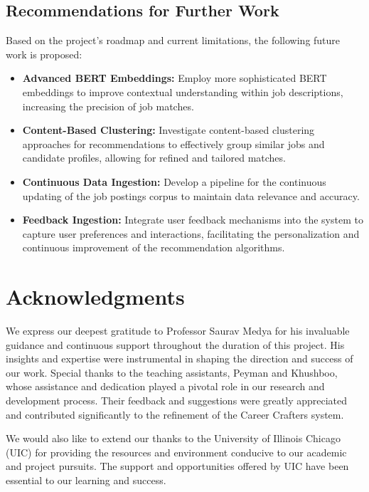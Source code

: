 \documentclass[a4paper,10pt]{article}
\begin{document}
\subsection{Recommendations for Further Work}
Based on the project's roadmap and current limitations, the following future work is proposed:
\begin{itemize}
  \item \textbf{Advanced BERT Embeddings:} Employ more sophisticated BERT embeddings to improve contextual understanding within job descriptions, increasing the precision of job matches.
  \item \textbf{Content-Based Clustering:} Investigate content-based clustering approaches for recommendations to effectively group similar jobs and candidate profiles, allowing for refined and tailored matches.
  \item \textbf{Continuous Data Ingestion:} Develop a pipeline for the continuous updating of the job postings corpus to maintain data relevance and accuracy.
  \item \textbf{Feedback Ingestion:} Integrate user feedback mechanisms into the system to capture user preferences and interactions, facilitating the personalization and continuous improvement of the recommendation algorithms.
\end{itemize}

\section*{Acknowledgments}

We express our deepest gratitude to Professor Saurav Medya for his invaluable guidance and continuous support throughout the duration of this project. His insights and expertise were instrumental in shaping the direction and success of our work. Special thanks to the teaching assistants, Peyman and Khushboo, whose assistance and dedication played a pivotal role in our research and development process. Their feedback and suggestions were greatly appreciated and contributed significantly to the refinement of the Career Crafters system.

We would also like to extend our thanks to the University of Illinois Chicago (UIC) for providing the resources and environment conducive to our academic and project pursuits. The support and opportunities offered by UIC have been essential to our learning and success.
\end{document}
